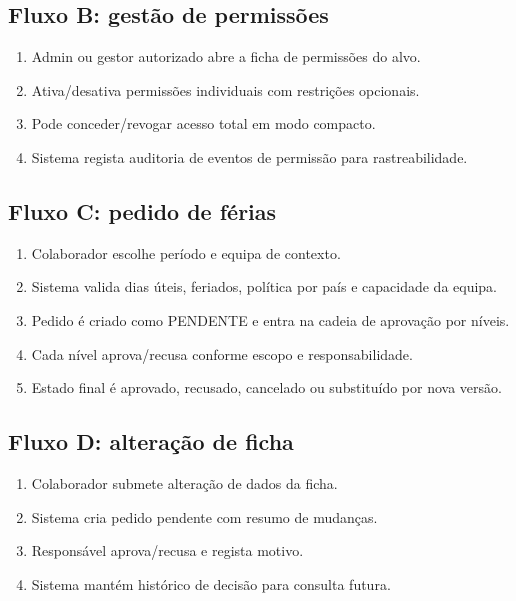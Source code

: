 \documentclass[11pt,a4paper]{article}
\begin{document}
\subsection{Fluxo B: gestão de permissões}
\begin{enumerate}
  \item Admin ou gestor autorizado abre a ficha de permissões do alvo.
  \item Ativa/desativa permissões individuais com restrições opcionais.
  \item Pode conceder/revogar acesso total em modo compacto.
  \item Sistema regista auditoria de eventos de permissão para rastreabilidade.
\end{enumerate}

\subsection{Fluxo C: pedido de férias}
\begin{enumerate}
  \item Colaborador escolhe período e equipa de contexto.
  \item Sistema valida dias úteis, feriados, política por país e capacidade da equipa.
  \item Pedido é criado como PENDENTE e entra na cadeia de aprovação por níveis.
  \item Cada nível aprova/recusa conforme escopo e responsabilidade.
  \item Estado final é aprovado, recusado, cancelado ou substituído por nova versão.
\end{enumerate}

\subsection{Fluxo D: alteração de ficha}
\begin{enumerate}
  \item Colaborador submete alteração de dados da ficha.
  \item Sistema cria pedido pendente com resumo de mudanças.
  \item Responsável aprova/recusa e regista motivo.
  \item Sistema mantém histórico de decisão para consulta futura.
\end{enumerate}
\end{document}
